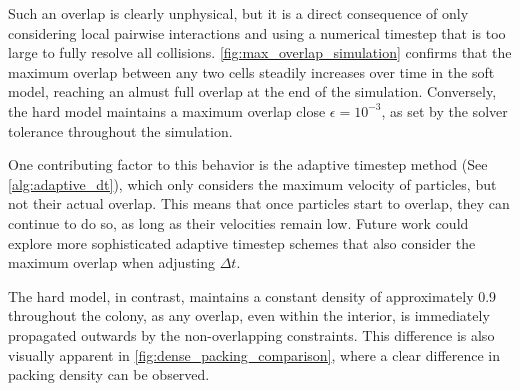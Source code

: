 \documentclass[conference]{IEEEtran}
\begin{document}
Such an overlap is clearly unphysical, but it is a direct consequence of only considering local pairwise interactions and using a numerical timestep that is too large to fully resolve all collisions. \autoref{fig:max_overlap_simulation} confirms that the maximum overlap between any two cells steadily increases over time in the soft model, reaching an almust full overlap at the end of the simulation. Conversely, the hard model maintains a maximum overlap close $\epsilon = 10^{-3}$, as set by the solver tolerance throughout the simulation.

One contributing factor to this behavior is the adaptive timestep method (See \autoref{alg:adaptive_dt}), which only considers the maximum velocity of particles, but not their actual overlap. This means that once particles start to overlap, they can continue to do so, as long as their velocities remain low. Future work could explore more sophisticated adaptive timestep schemes that also consider the maximum overlap when adjusting $\Delta t$.

The hard model, in contrast, maintains a constant density of approximately 0.9 throughout the colony, as any overlap, even within the interior, is immediately propagated outwards by the non-overlapping constraints. This difference is also visually apparent in \autoref{fig:dense_packing_comparison}, where a clear difference in packing density can be observed.
\end{document}
